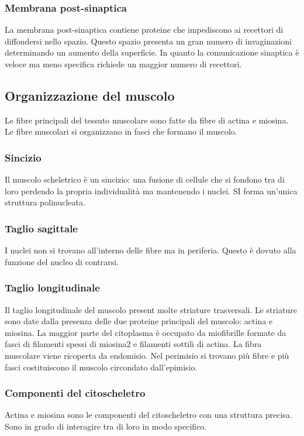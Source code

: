 		\subsubsection{Membrana post-sinaptica}
		La membrana post-sinaptica contiene proteine che impediscono ai recettori di diffondersi nello spazio.
		Questo spazio presenta un gran numero di invaginazioni determinando un aumento della superficie.
		In quanto la comunicazione sinaptica \`e veloce ma meno specifica richiede un maggior numero di recettori.

	\subsection{Organizzazione del muscolo}
	Le fibre principali del tessuto muscolare sono fatte da fibre di actina e miosina.
	Le fibre muscolari si organizzano in fasci che formano il muscolo.
	
		\subsubsection{Sincizio}
		Il muscolo scheletrico \`e un sincizio: una fusione di cellule che si fondono tra di loro perdendo la propria individualit\`a ma mantenendo i nuclei.
		SI forma un'unica struttura polinucleata.

		\subsubsection{Taglio sagittale}
		I nuclei non si trovano all'interno delle fibre ma in periferia.
		Questo \`e dovuto alla funzione del nucleo di contrarsi.

		\subsubsection{Taglio longitudinale}
		Il taglio longitudinale del muscolo present molte striature trasversali.
		Le striature sono date dalla presenza delle due proteine principali del muscolo: actina e miosina.
		La maggior parte del citoplasma \`e occupato da miofibrille formate da fasci di filamenti spessi di miosina$2$ e filamenti sottili di actina.
		La fibra muscolare viene ricoperta da endomisio.
		Nel perimisio si trovano pi\`u fibre e pi\`u fasci costituiscono il muscolo circondato dall'epimisio.

		\subsubsection{Componenti del citoscheletro}
		Actina e miosina sono le componenti del citoscheletro con una struttura precisa.
		Sono in grado di interagire tra di loro in modo specifico.


